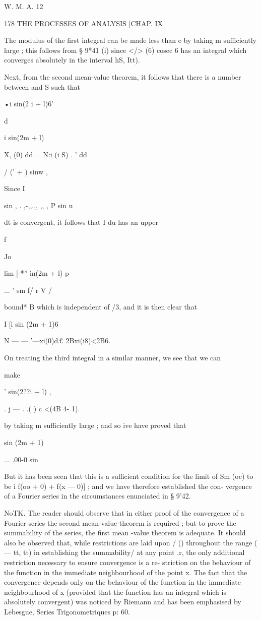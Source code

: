 W. M. A. 12

178 THE PROCESSES OF ANALYSIS [CHAP. IX

The modulus of the first integral can be made less than e by taking m
sufficiently large ; this follows from § 9*41 (i) since </> (6) cosec
6 has an integral which converges absolutely in the interval hS, Itt).

Next, from the second mean-value theorem, it follows that there is a
number between and S such that

•i sin(2 i + l)6'

d

i sin(2m + l)

X, (0) dd = N:i (i S) . ' dd

  / (' + ) sinw ,

Since I

sin , . ,-,,.,, ,, , P sin u

dt is convergent, it follows that I du has an upper

f

Jo

lim |-*'' in(2m + l) p

... ' sm f/ r V /

bound* B which is independent of /3, and it is then clear that

I [i sin (2m + 1)6

N — — '—xi(0)d£ 2Bxi(i8)<2B6.

On treating the third integral in a similar manner, we see that we can

make

  ' sin(2??i + l) ,

. j — . .( ) c <(4B 4- 1).

by taking m sufficiently large ; and so ive have proved that

sin (2m + 1)

... .00-0 sin

But it has been seen that this is a sufficient condition for the limit
of Sm (oc) to be i f(oo + 0) + f(x — 0)] ; and we have therefore
established the con- vergence of a Fourier series in the circumstances
enunciated in § 9'42.

NoTK. The reader should observe that in either proof of the
convergence of a Fourier series the second mean-value theorem is
required ; but to prove the summability of the series, the first mean
-value theorem is adequate. It should also be observed that, while
restrictions are laid upon / () throughout the range ( — tt, tt) in
establishing the summability/ at any point .r, the only additional
restriction necessary to ensure convergence is a re- striction on the
behaviour of the function in the immediate neighbourhood of the point
x. The fact that the convergence depends only on the behaviour of the
function in the immediate neighbourhood of x (provided that the
function has an integral which is absolutely convergent) was noticed
by Riemann and has been emphasised by Lebesgue, Series
Trigonometriques p: 60.


